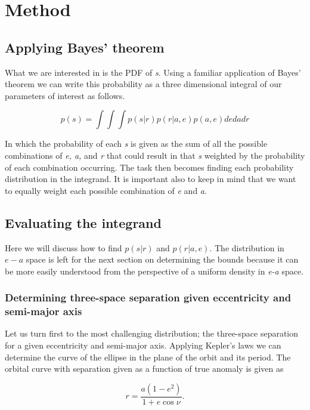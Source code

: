 \documentclass{article}
\begin{document}
	\section{Method}
	\subsection{Applying Bayes' theorem}
		What we are interested in is the PDF of \textit{s}. Using a familiar application of Bayes' theorem we can write this probability as a three dimensional integral of our parameters of interest as follows.  

	\begin{equation} \label{s}
	p(s) = \int \int \int p(s|r) p(r|a, e) p(a, e) de da dr
	\end{equation}
	
	In which the probability of each \textit{s} is given as the sum of all the possible combinations of \textit{e, a,} and \textit{r} that could result in that \textit{s} weighted by the probability of each combination occurring. The task then becomes finding each probability distribution in the integrand. It is important also to keep in mind that we want to equally weight each possible combination of \textit{e} and \textit{a}.
	
	\subsection{Evaluating the integrand}
	Here we will discuss how to find $p(s|r)$ and $p(r|a,e)$. The distribution in $e-a$ space is left for the next section on determining the bounds because it can be more easily understood from the perspective of a uniform density in \textit{e-a} space.
	
	\subsubsection{Determining three-space separation given eccentricity and semi-major axis}
	Let us turn first to the most challenging distribution; the three-space separation for a given eccentricity and semi-major axis. Applying Kepler's laws we can determine the curve of the ellipse in the plane of the orbit and its period. The orbital curve with separation given as a function of true anomaly is given as
	
	\begin{equation}
	r = \frac{a(1-e^2)}{1 + e\cos{\nu}}.
	\end{equation}
	
\end{document}
